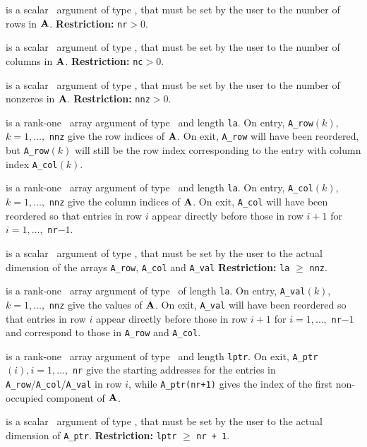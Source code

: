 \documentclass{galahad}
\begin{document}
\begin{description}

 is a scalar \intentin\ argument of type
\integer, that must be set by the user to the number of
rows in ${\mathbf{A}}$.
{\bf Restriction:} {\tt nr}$ > 0$.

 is a scalar \intentin\ argument of type
\integer, that must be set by the user to the number of
columns in ${\mathbf{A}}$.
{\bf Restriction:} {\tt nc}$ > 0$.

 is a scalar \intentin\ argument of type
\integer, that must be set by the user to the number of
nonzeros in ${\mathbf{A}}$.
{\bf Restriction:} {\tt nnz}$ > 0$.

  is a rank-one \intentinout\ array argument of type
\integer\ and length {\tt la}.
On entry, {\tt A\_row}$(k)$, $k = 1, \ldots,$ {\tt nnz} give
the row indices of ${\mathbf{A}}$. On exit, {\tt A\_row} will have been reordered, but
{\tt A\_row}$(k)$ will still be the row index corresponding to the
entry with column index {\tt A\_col}$(k)$.

  is a rank-one \intentinout\ array argument of type
\integer\ and length {\tt la}.
On entry, {\tt A\_col}$(k)$, $k = 1, \ldots,$ {\tt nnz} give
the column indices of ${\mathbf{A}}$. On exit, {\tt A\_col}
will have been reordered so that entries in row $i$ appear directly before
those in row $i+1$ for $i = 1, \ldots ,$ {\tt nr}$-1$.

is a scalar \intentin\ argument of type
\integer, that must be set by the user to the actual dimension of the arrays
{\tt A\_row},
{\tt A\_col}
and
{\tt A\_val}
{\bf Restriction:} {\tt la} $\geq$ {\tt nnz}.

is a rank-one \intentinout\ array argument of type
\realdp\ of length {\tt la}.
On entry, {\tt A\_val}$(k)$, $k = 1, \ldots,$ {\tt nnz} give the
values of ${\mathbf{A}}$.
On exit, {\tt A\_val} will have been reordered so that
entries in row $i$ appear directly before those in row $i+1$ for
$i = 1, \ldots,$ {\tt nr}$-1$ and correspond to those in
{\tt A\_row} and {\tt A\_col}.

  is a rank-one \intentout\ array argument of type
\integer\ and length {\tt lptr}.
On exit, {\tt A\_ptr}$(i), i = 1, \ldots,$ {\tt nr} give
the starting addresses for the entries in {\tt A\_row}/{\tt A\_col}/{\tt A\_val}
in row $i$, while {\tt A\_ptr(nr+1)}
gives the index of the first non-occupied component of ${\mathbf{A}}$.

 is a scalar \intentin\ argument of type
\integer, that must be set by the user to the
actual dimension of {\tt A\_ptr}.
{\bf Restriction:} {\tt lptr} $\geq$ {\tt nr + 1}.


\end{description}
\end{document}
